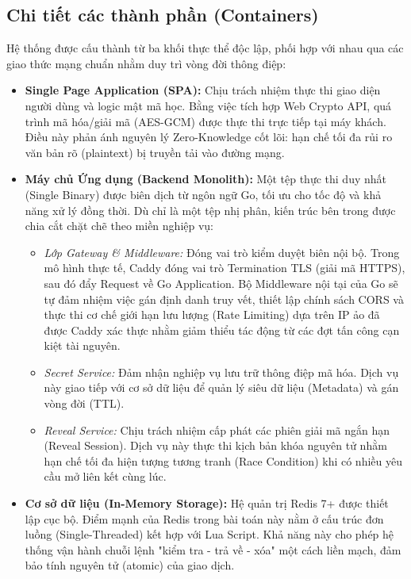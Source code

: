 \subsection{Chi tiết các thành phần (Containers)}

Hệ thống được cấu thành từ ba khối thực thể độc lập, phối hợp với nhau qua các giao thức mạng chuẩn nhằm duy trì vòng đời thông điệp:

\begin{itemize}
    \item \textbf{Single Page Application (SPA):} Chịu trách nhiệm thực thi giao diện người dùng và logic mật mã học. Bằng việc tích hợp Web Crypto API, quá trình mã hóa/giải mã (AES-GCM) được thực thi trực tiếp tại máy khách. Điều này phản ánh nguyên lý Zero-Knowledge cốt lõi: hạn chế tối đa rủi ro văn bản rõ (plaintext) bị truyền tải vào đường mạng.
    
    \item \textbf{Máy chủ Ứng dụng (Backend Monolith):} Một tệp thực thi duy nhất (Single Binary) được biên dịch từ ngôn ngữ Go, tối ưu cho tốc độ và khả năng xử lý đồng thời. Dù chỉ là một tệp nhị phân, kiến trúc bên trong được chia cắt chặt chẽ theo miền nghiệp vụ:
    \begin{itemize}
        \item \textit{Lớp Gateway \& Middleware:} Đóng vai trò kiểm duyệt biên nội bộ. Trong mô hình thực tế, Caddy đóng vai trò Termination TLS (giải mã HTTPS), sau đó đẩy Request về Go Application. Bộ Middleware nội tại của Go sẽ tự đảm nhiệm việc gán định danh truy vết, thiết lập chính sách CORS và thực thi cơ chế giới hạn lưu lượng (Rate Limiting) dựa trên IP ảo đã được Caddy xác thực nhằm giảm thiểu tác động từ các đợt tấn công cạn kiệt tài nguyên.
        \item \textit{Secret Service:} Đảm nhận nghiệp vụ lưu trữ thông điệp mã hóa. Dịch vụ này giao tiếp với cơ sở dữ liệu để quản lý siêu dữ liệu (Metadata) và gán vòng đời (TTL).
        \item \textit{Reveal Service:} Chịu trách nhiệm cấp phát các phiên giải mã ngắn hạn (Reveal Session). Dịch vụ này thực thi kịch bản khóa nguyên tử nhằm hạn chế tối đa hiện tượng tương tranh (Race Condition) khi có nhiều yêu cầu mở liên kết cùng lúc.
    \end{itemize}
    
    \item \textbf{Cơ sở dữ liệu (In-Memory Storage):} Hệ quản trị Redis 7+ được thiết lập cục bộ. Điểm mạnh của Redis trong bài toán này nằm ở cấu trúc đơn luồng (Single-Threaded) kết hợp với Lua Script. Khả năng này cho phép hệ thống vận hành chuỗi lệnh "kiểm tra - trả về - xóa" một cách liền mạch, đảm bảo tính nguyên tử (atomic) của giao dịch.
\end{itemize}

